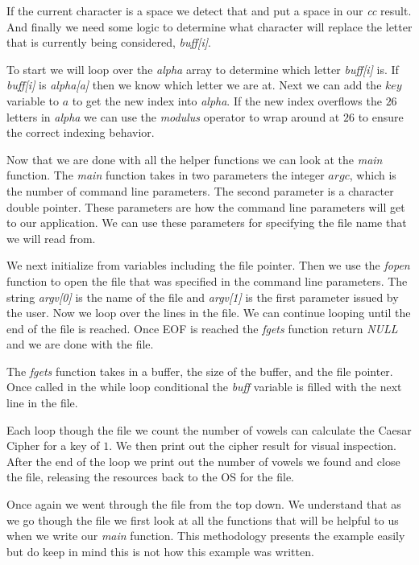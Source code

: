 If the current character is a space we detect that and put a space in our \emph{cc} result. And finally we need some logic to determine what character will replace the letter that is currently being considered, \emph{buff[i]}. 

To start we will loop over the \emph{alpha} array to determine which letter \emph{buff[i]} is. If \emph{buff[i]} is \emph{alpha[a]} then we know which letter we are at. Next we can add the $key$ variable to $a$ to get the new index into \emph{alpha}. If the new index overflows the $26$ letters in \emph{alpha} we can use the \emph{modulus} operator to wrap around at $26$ to ensure the correct indexing behavior.

Now that we are done with all the helper functions we can look at the \emph{main} function. The \emph{main} function takes in two parameters the integer $argc$, which is the number of command line parameters. The second parameter is a character double pointer. These parameters are how the command line parameters will get to our application. We can use these parameters for specifying the file name that we will read from. 

We next initialize from variables including the file pointer. Then we use the \emph{fopen} function to open the file that was specified in the command line parameters. The string \emph{argv[0]} is the name of the file and \emph{argv[1]} is the first parameter issued by the user. Now we loop over the lines in the file. We can continue looping until the end of the file is reached. Once \ac{EOF} is reached the \emph{fgets} function return \emph{NULL} and we are done with the file. 

The \emph{fgets} function takes in a buffer, the size of the buffer, and the file pointer. Once called in the while loop conditional the \emph{buff} variable is filled with the next line in the file. 

Each loop though the file we count the number of vowels can calculate the Caesar Cipher for a key of $1$. We then print out the cipher result for visual inspection. After the end of the loop we print out the number of vowels we found and close the file, releasing the resources back to the \ac{OS} for the file. 



Once again we went through the file from the top down. We understand that as we go though the file we first look at all the functions that will be helpful to us when we write our \emph{main} function. This methodology presents the example easily but do keep in mind this is not how this example was written. 

